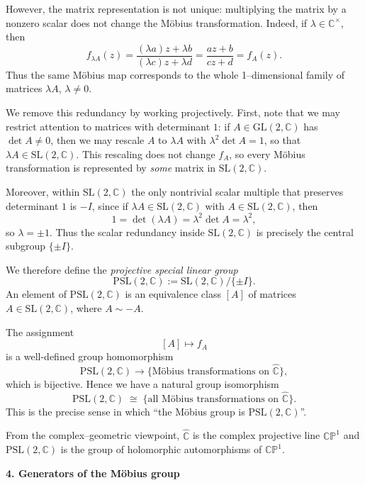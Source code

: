 \begin{solution}
	However, the matrix representation is not unique: multiplying the matrix by
	a nonzero scalar does not change the M\"{o}bius transformation.  Indeed, if
	$\lambda\in\mathbb{C}^{\times}$, then
	\[
	f_{\lambda A}(z)
	= \frac{(\lambda a)z + \lambda b}{(\lambda c)z + \lambda d}
	= \frac{az+b}{cz+d}
	= f_{A}(z).
	\]
	Thus the same M\"{o}bius map corresponds to the whole 1--dimensional family of
	matrices $\lambda A$, $\lambda\neq 0$.
	
	We remove this redundancy by working projectively.  First, note that we may
	restrict attention to matrices with determinant $1$:
	if $A\in\mathrm{GL}(2,\mathbb{C})$ has $\det A\neq 0$, then we may rescale
	$A$ to $\lambda A$ with $\lambda^2\det A = 1$, so that $\lambda A\in
	\mathrm{SL}(2,\mathbb{C})$.  This rescaling does not change $f_A$, so every
	M\"{o}bius transformation is represented by \emph{some} matrix in
	$\mathrm{SL}(2,\mathbb{C})$.
	
	Moreover, within $\mathrm{SL}(2,\mathbb{C})$ the only nontrivial scalar
	multiple that preserves determinant $1$ is $-I$, since if
	$\lambda A\in\mathrm{SL}(2,\mathbb{C})$ with $A\in\mathrm{SL}(2,\mathbb{C})$,
	then
	\[
	1 = \det(\lambda A) = \lambda^{2}\det A = \lambda^2,
	\]
	so $\lambda = \pm 1$.  Thus the scalar redundancy inside
	$\mathrm{SL}(2,\mathbb{C})$ is precisely the central subgroup
	$\{\pm I\}$.
	
	We therefore define the \emph{projective special linear group}
	\[
	\mathrm{PSL}(2,\mathbb{C})
	:= \mathrm{SL}(2,\mathbb{C}) / \{\pm I\}.
	\]
	An element of $\mathrm{PSL}(2,\mathbb{C})$ is an equivalence class $[A]$ of
	matrices $A\in\mathrm{SL}(2,\mathbb{C})$, where $A\sim -A$.
	
	The assignment
	\[
	[A] \longmapsto f_A
	\]
	is a well-defined group homomorphism
	\[
	\mathrm{PSL}(2,\mathbb{C})
	\longrightarrow
	\{\text{M\"{o}bius transformations on }\widehat{\mathbb{C}}\},
	\]
	which is bijective.  Hence we have a natural group isomorphism
	\[
	\mathrm{PSL}(2,\mathbb{C})
	\;\cong\;
	\{\text{all M\"{o}bius transformations on }\widehat{\mathbb{C}}\}.
	\]
	This is the precise sense in which ``the M\"{o}bius group is
	$\mathrm{PSL}(2,\mathbb{C})$''.
	
	From the complex--geometric viewpoint, $\widehat{\mathbb{C}}$ is the complex
	projective line $\mathbb{CP}^{1}$ and $\mathrm{PSL}(2,\mathbb{C})$ is the
	group of holomorphic automorphisms of $\mathbb{CP}^{1}$.
	
	\par\medskip\noindent\textbf{4. Generators of the M\"{o}bius group}\par\smallskip


\end{solution}

